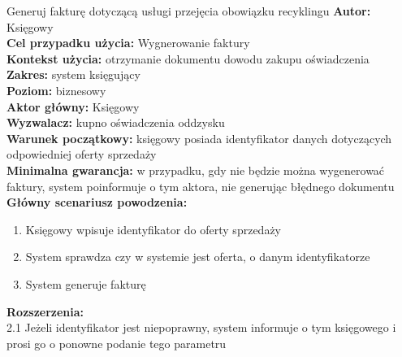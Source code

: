 \begin{usecase}{Generuj fakturę dotyczącą usługi przejęcia obowiązku recyklingu}
	\textbf{Autor:} Księgowy\\
	\textbf{Cel przypadku użycia:} Wygnerowanie faktury \\
	\textbf{Kontekst użycia:} otrzymanie dokumentu dowodu zakupu oświadczenia  \\
	\textbf{Zakres:} system księgujący \\
	\textbf{Poziom:} biznesowy \\
	\textbf{Aktor główny:} Księgowy \\
	\textbf{Wyzwalacz:} kupno oświadczenia oddzysku \\
	\textbf{Warunek początkowy:} księgowy posiada identyfikator danych dotyczących odpowiedniej oferty sprzedaży \\
	\textbf{Minimalna gwarancja:} w przypadku, gdy nie będzie można wygenerować faktury, system poinformuje o tym aktora, nie generując błędnego dokumentu \\
	\textbf{Główny scenariusz powodzenia:} 
		\begin{enumerate}
			\item Księgowy wpisuje identyfikator do oferty sprzedaży
			\item System sprawdza czy w systemie jest oferta, o danym identyfikatorze
			\item System generuje fakturę 
		\end{enumerate}
	\textbf{Rozszerzenia:} \\
	2.1 Jeżeli identyfikator jest niepoprawny, system informuje o tym księgowego i prosi go o ponowne podanie tego parametru
\end{usecase}

